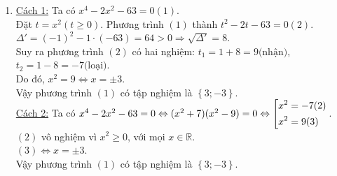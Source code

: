 \begin{ex}
{\begin{enumerate}
        Vậy phương trình đã cho có tập nghiệm là 
        $\left\{ -2; \dfrac{1}{3} \right\}$.
        \item \underline{Cách 1:} Ta có $x^4 - 2x^2 -63=0 (1)$. \\
        Đặt $t=x^2 (t \geq 0)$. Phương trình $(1)$ thành $t^2-2t-63=0 (2)$.\\
        $\Delta'=(-1)^2-1 \cdot (-63)=64>0 \Rightarrow \sqrt{\Delta'}=8$.\\
        Suy ra phương trình $(2)$ có hai nghiệm: $t_1=1+8=9 \mbox{(nhận)}$, $t_2=1-8=-7 \mbox{(loại)}$.\\
        Do đó, $x^2=9 \Leftrightarrow x=\pm 3$.\\
     	Vậy phương trình $(1)$ có tập nghiệm là $\left\{ 3; -3 \right\}$.\\
     	\underline{Cách 2:} Ta có $x^4-2x^2-63=0 \Leftrightarrow (x^2+7)(x^2-9)=0 \Leftrightarrow \left[\begin{aligned}x^2&=-7 (2)\\ x^2&=9 (3)\end{aligned}\right.$.\\
     	$(2)$ vô nghiệm vì $x^2 \ge 0$, với mọi $x \in \mathbb{R}$.\\
     	$(3) \Leftrightarrow x=\pm 3$.\\
     	Vậy phương trình $(1)$ có tập nghiệm là $\left\{ 3; -3 \right\}$.
    \end{enumerate}
    }
\end{ex}

